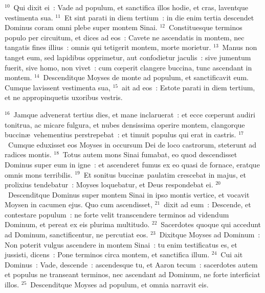 ${}^{10}$~Qui dixit ei~: Vade ad populum, et sanctifica illos hodie, et cras, laventque vestimenta sua.
${}^{11}$~Et sint parati in diem tertium~: in die enim tertia descendet Dominus coram omni plebe super montem Sinai.
${}^{12}$~Constituesque terminos populo per circuitum, et dices ad eos~: Cavete ne ascendatis in montem, nec tangatis fines illius~: omnis qui tetigerit montem, morte morietur.
${}^{13}$~Manus non tanget eum, sed lapidibus opprimetur, aut confodietur jaculis~: sive jumentum fuerit, sive homo, non vivet~: cum cœperit clangere buccina, tunc ascendant in montem.
${}^{14}$~Descenditque Moyses de monte ad populum, et sanctificavit eum. Cumque lavissent vestimenta sua,
${}^{15}$~ait ad eos~: Estote parati in diem tertium, et ne appropinquetis uxoribus vestris.


${}^{16}$~Jamque advenerat tertius dies, et mane inclaruerat~: et ecce cœperunt audiri tonitrua, ac micare fulgura, et nubes densissima operire montem, clangorque buccin\ae\ vehementius perstrepebat~: et timuit populus qui erat in castris.
${}^{17}$~Cumque eduxisset eos Moyses in occursum Dei de loco castrorum, steterunt ad radices montis.
${}^{18}$~Totus autem mons Sinai fumabat, eo quod descendisset Dominus super eum in igne~: et ascenderet fumus ex eo quasi de fornace, eratque omnis mons terribilis.
${}^{19}$~Et sonitus buccin\ae\ paulatim crescebat in majus, et prolixius tendebatur~: Moyses loquebatur, et Deus respondebat ei.
${}^{20}$~Descenditque Dominus super montem Sinai in ipso montis vertice, et vocavit Moysen in cacumen ejus. Quo cum ascendisset,
${}^{21}$~dixit ad eum~: Descende, et contestare populum~: ne forte velit transcendere terminos ad videndum Dominum, et pereat ex eis plurima multitudo.
${}^{22}$~Sacerdotes quoque qui accedunt ad Dominum, sanctificentur, ne percutiat eos.
${}^{23}$~Dixitque Moyses ad Dominum~: Non poterit vulgus ascendere in montem Sinai~: tu enim testificatus es, et jussisti, dicens~: Pone terminos circa montem, et sanctifica illum.
${}^{24}$~Cui ait Dominus~: Vade, descende~: ascendesque tu, et Aaron tecum~: sacerdotes autem et populus ne transeant terminos, nec ascendant ad Dominum, ne forte interficiat illos.
${}^{25}$~Descenditque Moyses ad populum, et omnia narravit eis.

